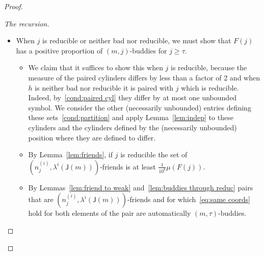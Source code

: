 \documentclass[10pt]{amsart}
\theoremstyle{definition}\newtheorem{defi}[theo]{Definition}\newtheorem{rema}[theo]{Remark}\newtheorem{exam}[theo]{Example}\newtheorem{exem}[theo]{Example}\newtheorem{nota}[theo]{Notation}
\DeclareMathOperator{\bad}{\mathsf{V}}
\DeclareMathOperator{\p}{\mathsf{p}}
\newcommand{\lft}{\mathsf{L}}
\newcommand{\rht}{\mathsf{R}}
\newcommand{\scl}{\mathsf{J}}
\let\originalleft\left
\let\originalright\right
\renewcommand{\left}{\mathopen{}\mathclose\bgroup\originalleft}
\renewcommand{\right}{\aftergroup\egroup\originalright}
\begin{document}
\begin{proof}
\begin{proof}[{The recursion}]
\begin{itemize}
With~\eqref{eqn:bad pair sets comparable} established it suffices to find a positive proportion of $(m,\tau)$ buddies in either $A^{(i)}_j$ or $A^{(i)}_k$. How this is done depends on why the pair $h,j$ is bad.
\begin{itemize}
\item If $\scl(n^{(i)}_j) = \lambda^i(\scl(m))$ and $s \in \{
\lft(n^{(i)}_j), \rht(n^{(i)}_j) \}$ at a bounded scale not smaller than $\tau$ apply Theorem~\ref{thm:bounded wfriends} with $s$ in place of $r$ and note that the set $B$ therein is defined by coordinates no larger than $\scl(s) + 1$ while $A^{(i)}_j$ is defined by coordinates no smaller than $\lambda^{i-1}(\scl(m))$. We may therefore apply Lemma~\ref{lem:indep} to get
\[
\mu\left(B \cap A^{(i)}_j\right) \ge \left(1 - \frac{1}{2^{2^5}} \right) \mu(B) \mu\left(A^{(i)}_j\right)
\]
whence a positive proportion of $A^{(i)}_j$ intersects $B$. Removing $\bad(\scl(s),8s)$ and~\eqref{eqn:bad ancestors} leaves us with a positive proportion of $(m,\tau)$ buddies, as in the proof of Corollary~\ref{cor:bounded mmix}.
\item If $\scl(n^{(i)}_j) = \lambda^i(\scl(m))$ and $n^{(i)}_j <
\frac{3}{4} \p(\lambda^i(\scl(m)))$ apply Proposition~\ref{prop:small friend}.
\item If instead $\scl(n^{(i)}_h) = \lambda^i(\scl(m))$ the arguments are exactly the same upon replacing $j$ with $h$.
\end{itemize}
\item When $j$ is reducible or neither bad nor reducible, we must show that $F(j)$ has a positive proportion of $(m,j)$-buddies for $j\geq \tau$.
\begin{itemize}
\item We claim that it suffices to show this when $j$ is reducible, because the measure of the paired cylinders differs by less than a factor of 2 and when $h$ is neither bad nor reducible it is paired with $j$ which is reducible. Indeed, by~\eqref{cond:paired cyl} they differ by at most one unbounded symbol. We consider the other (necessarily unbounded) entries defining these sets~\eqref{cond:partition} and apply Lemma~\ref{lem:indep} to these cylinders and the cylinders defined by the (necessarily unbounded) position where they are defined to differ.
\item By Lemma~\ref{lem:friends}, if $j$ is reducible the set of $(n_j^{(i)},\lambda^{i}(\scl(m)))$-friends is at least $\frac{1}{10^6}\mu(F(j))$.
\item By Lemmas~\ref{lem:friend to weak} and~\ref{lem:buddies through reduc} pairs that are $(n_j^{(i)},\lambda^{i}(\scl(m)))$-friends and for which~\eqref{eq:same coords} hold for both elements of the pair are automatically $(m,\tau)$-buddies.
\end{itemize}
\end{itemize}


\end{proof}
\end{proof}
\end{document}
